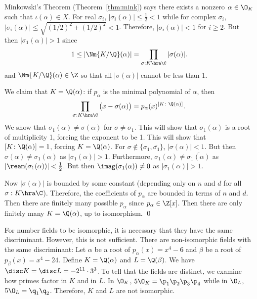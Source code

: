Minkowski's Theorem (Theorem~\ref{thm:mink}) says there exists a nonzero $\alpha \in \O_K$ such that $\iota(\alpha) \in X$. For real $\sigma_i$, $|\sigma_i(\alpha)| \leq \frac{1}{2}<1$ while for complex $\sigma_i$, $|\sigma_i(\alpha)| \leq \sqrt{(1/2)^2+(1/2)^2}<1$. Therefore, $|\sigma_i(\alpha)|<1$ for $i \geq 2$. But then $|\sigma_1(\alpha)|>1$ since 
	\[
	1 \leq |\Nm{K/\Q}(\alpha)|= \prod_{\sigma: K \hra \C} |\sigma(\alpha)|.
	\]
and $\Nm{K/\Q}(\alpha) \in \Z$ so that all $|\sigma(\alpha)|$ cannot be less than 1. 


We claim that $K=\Q(\alpha)$: if $p_\alpha$ is the minimal polynomial of $\alpha$, then
	\[
	\prod_{\sigma: K \hra \C} \big( x-\sigma(\alpha) \big)= p_\alpha(x)^{[K \colon \Q(\alpha)]}.
	\]
We show that $\sigma_1(\alpha) \neq \sigma(\alpha)$ for $\sigma \neq \sigma_1$. This will show that $\sigma_1(\alpha)$ is a root of multiplicity 1, forcing the exponent to be 1. This will show that $[K \colon \Q(\alpha)]=1$, forcing $K=\Q(\alpha)$. For $\sigma \notin \{\sigma_1, \overline{\sigma_1}\}$, $|\sigma(\alpha)|<1$. But then $\sigma(\alpha) \neq \sigma_1(\alpha)$ as $|\sigma_1(\alpha)|>1$. Furthermore, $\sigma_1(\alpha) \neq \overline{\sigma_1(\alpha)}$ as $|\ream(\sigma_1(\alpha))|<\frac{1}{2}$. But then $\imag(\sigma_1(\alpha)) \neq 0$ as $|\sigma_1(\alpha)|>1$. 

Now $|\sigma(\alpha)|$ is bounded by some constant (depending only on $n$ and $d$ for all $\sigma: K \hra \C$). Therefore, the coefficients of $p_\alpha$ are bounded in terms of $n$ and $d$. Then there are finitely many possible $p_\alpha$ since $p_\alpha \in \Z[x]$. Then there are only finitely many $K=\Q(\alpha)$, up to isomorphism. \qed \\

\begin{ex}
For number fields to be isomorphic, it is necessary that they have the same discriminant. However, this is not sufficient. There are non-isomorphic fields with the same discriminant: Let $\alpha$ be a root of $p_\alpha(x)=x^4-6$ and $\beta$ be a root of $p_\beta(x)=x^4-24$. Define $K=\Q(\alpha)$ and $L=\Q(\beta)$. We have $\disc K=\disc L = -2^{11} \cdot 3^3$. To tell that the fields are distinct, we examine how primes factor in $K$ and in $L$. In $\O_K$, $5\O_K= \p_1\p_2\p_3\p_4$ while in $\O_L$, $5\O_L=\q_1\q_2$. Therefore, $K$ and $L$ are not isomorphic. \xqed
\end{ex}



